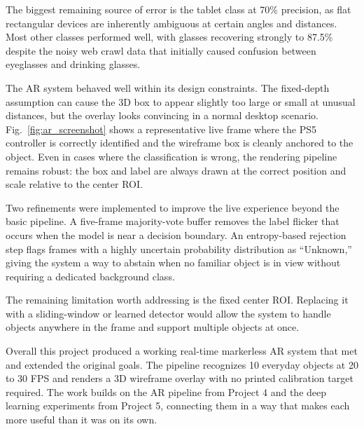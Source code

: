 \documentclass[conference]{IEEEtran}
\begin{document}
The biggest remaining source of error is the tablet class at 70\% precision,
as flat rectangular devices are inherently ambiguous at certain angles and
distances. Most other classes performed well, with glasses recovering strongly
to 87.5\% despite the noisy web crawl data that initially caused confusion
between eyeglasses and drinking glasses.

The AR system behaved well within its design constraints. The fixed-depth
assumption can cause the 3D box to appear slightly too large or small at
unusual distances, but the overlay looks convincing in a normal desktop
scenario. Fig.~\ref{fig:ar_screenshot} shows a representative live frame
where the PS5 controller is correctly identified and the wireframe box is
cleanly anchored to the object. Even in cases where the classification is
wrong, the rendering pipeline remains robust: the box and label are always
drawn at the correct position and scale relative to the center ROI.

Two refinements were implemented to improve the live experience beyond the
basic pipeline. A five-frame majority-vote buffer removes the label flicker
that occurs when the model is near a decision boundary. An entropy-based
rejection step flags frames with a highly uncertain probability distribution
as ``Unknown,'' giving the system a way to abstain when no familiar object
is in view without requiring a dedicated background class.

The remaining limitation worth addressing is the fixed center ROI. Replacing
it with a sliding-window or learned detector would allow the system to handle
objects anywhere in the frame and support multiple objects at once.

Overall this project produced a working real-time markerless AR system that
met and extended the original goals. The pipeline recognizes 10 everyday
objects at 20 to 30 FPS and renders a 3D wireframe overlay with no printed
calibration target required. The work builds on the AR pipeline from Project 4
and the deep learning experiments from Project 5, connecting them in a way
that makes each more useful than it was on its own.
\end{document}
